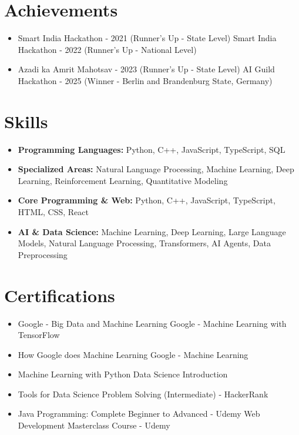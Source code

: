 \documentclass[a4paper,10pt]{article}
\begin{document}
\section*{Achievements}
\begin{itemize}
\item Smart India Hackathon - 2021 (Runner's Up - State Level) \hfill Smart India Hackathon - 2022 (Runner's Up - National Level)
\item Azadi ka Amrit Mahotsav - 2023 (Runner's Up - State Level) \hfill AI Guild Hackathon - 2025 (Winner - Berlin and Brandenburg State, Germany)
\end{itemize}

\section*{Skills}
\begin{itemize}
  \item \textbf{Programming Languages:} Python, C++, JavaScript, TypeScript, SQL
  \item \textbf{Specialized Areas:} Natural Language Processing, Machine Learning, Deep Learning, Reinforcement Learning, Quantitative Modeling
  \item \textbf{Core Programming \& Web:} Python, C++, JavaScript, TypeScript, HTML, CSS, React
  \item \textbf{AI \& Data Science:} Machine Learning, Deep Learning, Large Language Models, Natural Language Processing, Transformers, AI Agents, Data Preprocessing
\end{itemize}

\section*{Certifications}
\begin{itemize}
\item Google - Big Data and Machine Learning \hfill Google - Machine Learning with TensorFlow
\item How Google does Machine Learning \hfill Google - Machine Learning
\item Machine Learning with Python \hfill Data Science Introduction
\item Tools for Data Science \hfill Problem Solving (Intermediate) - HackerRank
\item Java Programming: Complete Beginner to Advanced - Udemy \hfill Web Development Masterclass Course - Udemy
\end{itemize}
\end{document}
